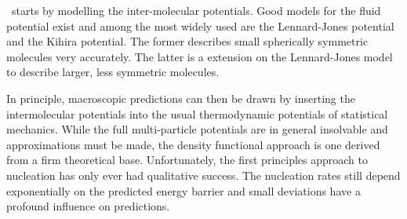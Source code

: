 
%  


 \Dft\ starts by modelling the inter-molecular potentials.
 Good models for the fluid potential exist and 
 among the most widely used are the Lennard-Jones potential
 and the Kihira potential.
 The former describes small spherically symmetric molecules very accurately.
 The latter is a extension on the Lennard-Jones model to describe larger, less symmetric molecules.


In principle, macroscopic predictions can then be drawn by inserting the intermolecular potentials into the usual thermodynamic potentials of statistical mechanics.  
While the full multi-particle potentials are in general insolvable and approximations must be made,
the density functional approach is one derived from a firm theoretical base\cite{Evans1992}.
Unfortunately, the first principles approach to nucleation has only ever had qualitative success\cite{Nyquist1995,Talanquer2001}.
The nucleation rates still depend exponentially on the predicted energy barrier and small deviations have a profound influence on predictions.

